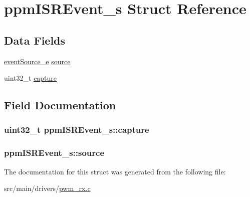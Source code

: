 \hypertarget{structppmISREvent__s}{\section{ppm\+I\+S\+R\+Event\+\_\+s Struct Reference}
\label{structppmISREvent__s}
}
\subsection*{Data Fields}
\begin{DoxyCompactItemize}
\item 
\hyperlink{pwm__rx_8c_a6cd2dfff1c140d9cb3e12e211fb805b3}{event\+Source\+\_\+e} \hyperlink{structppmISREvent__s_a4016774d10a83275b7ac9deab0fc8247}{source}
\item 
uint32\+\_\+t \hyperlink{structppmISREvent__s_a04725c07acd9de0597b3b53fc91d1841}{capture}
\end{DoxyCompactItemize}


\subsection{Field Documentation}
\hypertarget{structppmISREvent__s_a04725c07acd9de0597b3b53fc91d1841}{
\subsubsection[{capture}]{\setlength{\rightskip}{0pt plus 5cm}uint32\+\_\+t ppm\+I\+S\+R\+Event\+\_\+s\+::capture}}\label{structppmISREvent__s_a04725c07acd9de0597b3b53fc91d1841}
\hypertarget{structppmISREvent__s_a4016774d10a83275b7ac9deab0fc8247}{
\subsubsection[{source}]{ ppm\+I\+S\+R\+Event\+\_\+s\+::source}}\label{structppmISREvent__s_a4016774d10a83275b7ac9deab0fc8247}


The documentation for this struct was generated from the following file\+:\begin{DoxyCompactItemize}
\item 
src/main/drivers/\hyperlink{pwm__rx_8c}{pwm\+\_\+rx.\+c}\end{DoxyCompactItemize}
